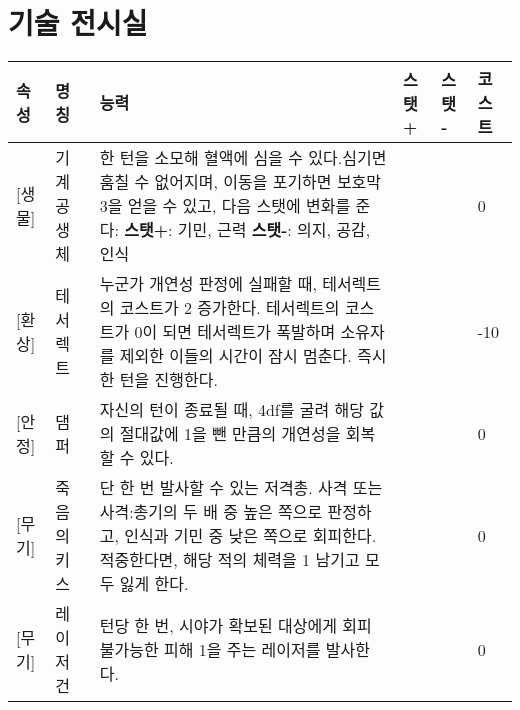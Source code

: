 \documentclass{report}
\begin{document}
	\section*{기술 전시실}
	\begin{tabularx}{\textwidth}{l!{\color{black}\vrule}l!{\color{black}\vrule}X!{\color{black}\vrule}l!{\color{black}\vrule}l!{\color{black}\vrule}l}
		\textbf{속성} & \textbf{명칭} & \textbf{능력} & \textbf{스탯 +} & \textbf{스탯 -} & \textbf{코스트}\\ \hline \hline
		[기술][생물]& 기계 공생체 & 한 턴을 소모해 혈액에 심을 수 있다.\newline 심기면 훔칠 수 없어지며, 이동을 포기하면 보호막 3을 얻을 수 있고, 다음 스탯에 변화를 준다: \newline \textbf{스탯+}: 기민, 근력 \newline \textbf{스탯-}: 의지, 공감, 인식  &   &     & 0 \\ \hline
		[기술][환상]& 테서렉트 & 누군가 개연성 판정에 실패할 때, 테서렉트의 코스트가 2 증가한다. \newline 테서렉트의 코스트가 0이 되면 테서렉트가 폭발하며 소유자를 제외한 이들의 시간이 잠시 멈춘다. 즉시 한 턴을 진행한다. &  &      & -10 \\ \hline
		[기술][안정]& 댐퍼 & 자신의 턴이 종료될 때, 4df를 굴려 해당 값의 절대값에 1을 뺀 만큼의 개연성을 회복할 수 있다.  &  &      & 0 \\ \hline
		[기술][무기]& 죽음의 키스 & 단 한 번 발사할 수 있는 저격총. 사격 또는 사격:총기의 두 배 중 높은 쪽으로 판정하고, 인식과 기민 중 낮은 쪽으로 회피한다. 적중한다면, 해당 적의 체력을 1 남기고 모두 잃게 한다.  &  &      & 0 \\ \hline
		[기술][무기]& 레이저 건 & 턴당 한 번, 시야가 확보된 대상에게 회피 불가능한 피해 1을 주는 레이저를 발사한다. &  & & 0\\
	\end{tabularx}
	
\end{document}
